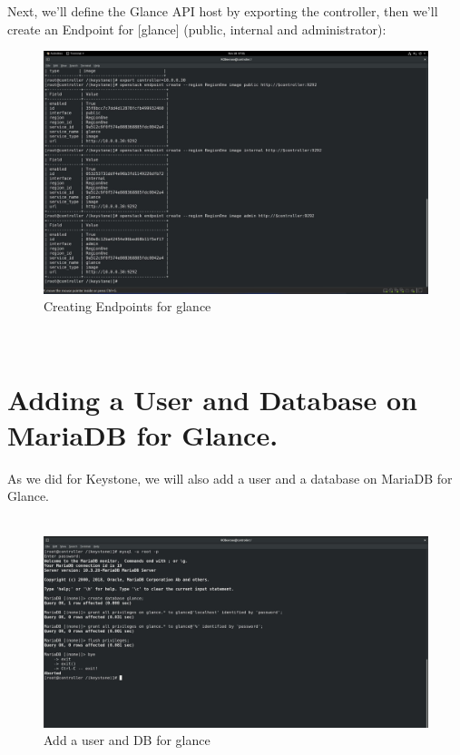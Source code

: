\begin{spacing}{1.2}
\par Next, we'll define the Glance API host by exporting the controller, then we'll create an Endpoint for [glance] (public, internal and administrator): 
\\
\begin{figure}[!htb] 
\begin{center} 
\includegraphics[width=1\linewidth]{Cloud/Configure Glance/Creating Endpoints for glance} 
\end{center} 
\caption{Creating Endpoints for glance} 
\end{figure}  \FloatBarrier
\\



\section{Adding a User and Database on MariaDB for Glance.}

\par As we did for Keystone, we will also add a user and a database on MariaDB for Glance.\\

\\
\begin{figure}[!htb] 
\begin{center} 
\includegraphics[width=1\linewidth]{Cloud/Configure Glance/Add a user and DB for glance} 
\end{center} 
\caption{Add a user and DB for glance} 
\end{figure}  \FloatBarrier
\\


\end{spacing}
